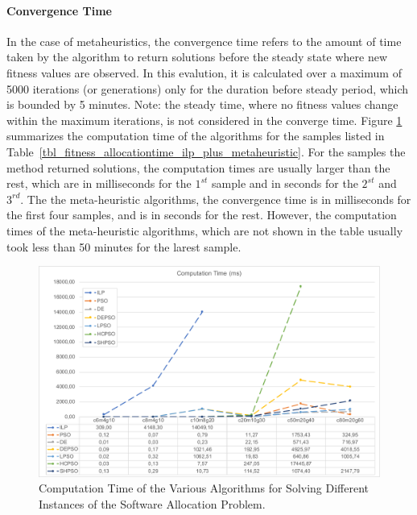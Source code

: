 \paragraph{Convergence Time} In the case of metaheuristics, the convergence time refers to the amount of time taken by the algorithm to return solutions before the steady state where new fitness values are observed. In this evalution, it is calculated over a maximum of 5000 iterations (or generations) only for the duration before steady period, which is bounded by 5 minutes. Note: the steady time, where no fitness values change within the maximum iterations, is not considered in the converge time.  Figure \ref{fig_allocationtime_ilp_metaheuristic} summarizes the computation time of the algorithms for the samples listed in Table~\ref{tbl_fitness_allocationtime_ilp_plus_metaheuristic}. For the samples the \ilp{} method returned solutions, the computation times are usually larger than the rest, which are in milliseconds for the $1^{st}$ sample and in seconds for the $2^{st}$  and $3^{rd}$.  The the meta-heuristic algorithms, the convergence time is in milliseconds for the first four samples, and is in seconds for the rest. However, the computation times of the meta-heuristic algorithms, which are not shown in the table usually took less than 50 minutes for the larest sample.
\begin{figure}
\centering
\includegraphics[width=1\linewidth]{img/time_summary.pdf}
\caption{Computation Time of the Various Algorithms for Solving Different Instances of the Software Allocation Problem.}
\label{fig_allocationtime_ilp_metaheuristic}\vspace{-0.4cm}
\end{figure}
%
